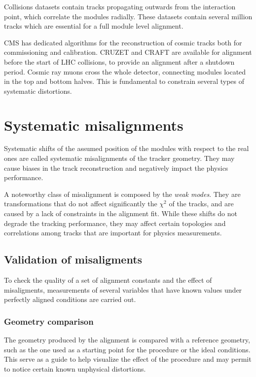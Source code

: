 Collisions datasets contain tracks propagating outwards from the interaction point, which correlate the modules radially.
These datasets contain several million tracks which are essential for a full module level alignment.

CMS has dedicated algorithms for the reconstruction of cosmic tracks both for commissioning and calibration.
CRUZET and CRAFT are available for alignment before the start of LHC collisions, to provide an alignment after a shutdown period.
Cosmic ray muons cross the whole detector, connecting modules located in the top and bottom halves.
This is fundamental to constrain several types of systematic distortions.

\section{Systematic misalignments}
Systematic shifts of the assumed position of the modules with respect to the real ones
are called systematic misalignments of the tracker geometry. They
may cause biases in the track reconstruction and negatively impact the physics performance.

A noteworthy class of misalignment is composed by the \textit{weak modes}.
They are transformations that do not affect significantly the $\chi^2$ of the tracks,
and are caused by a lack of constraints in the alignment fit.
While these shifts do not degrade the tracking performance,
they may affect certain topologies and correlations among tracks that are important for physics measurements.

\subsection{Validation of misaligments}
To check the quality of a set of alignment constants and the effect of misaligments,
measurements of several variables that have known values under perfectly aligned conditions are carried out.

\subsubsection{Geometry comparison} %
The geometry produced by the alignment is compared with a reference geometry,
such as the one used as a starting point for the procedure or the ideal conditions.
This serve as a guide to help visualize the effect of the procedure
and may permit to notice certain known unphysical distortions.

